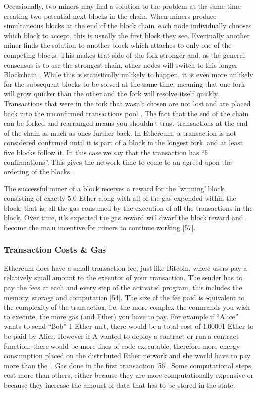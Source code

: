 \documentclass{article}
\begin{document}
Occasionally, two miners may find a solution to the problem at the same time creating two potential next blocks in the chain. When miners produce simultaneous blocks at the end of the block chain, each node individually chooses which block to accept, this is usually the first block they see. Eventually another miner finds the solution to another block which attaches to only one of the competing blocks. This makes that side of the fork stronger and, as the general consensus is to use the strongest chain, other nodes will switch to this longer Blockchain \citep{20_developer_guide_bitcoin_2016}. While this is statistically unlikely to happen, it is even more unlikely for the subsequent blocks to be solved at the same time, meaning that one fork will grow quicker than the other and the fork will resolve itself quickly. Transactions that were in the fork that wasn't chosen are not lost and are placed back into the unconfirmed transactions pool \citep{4_driscoll_2016}. The fact that the end of the chain can be forked and rearranged means you shouldn't trust transactions at the end of the chain as much as ones further back. In Ethereum, a transaction is not considered confirmed until it is part of a block in the longest fork, and at least five blocks follow it. In this case we say that the transaction has ``5 confirmations''. This gives the network time to come to an agreed-upon the ordering of the blocks \citep{35_nielsen_2013}.

The successful miner of a block receives a reward for the 'winning' block, consisting of exactly 5.0 Ether along with all of the gas expended within the block, that is, all the gas consumed by the execution of all the transactions in the block. Over time, it's expected the gas reward will dwarf the block reward and become the main incentive for miners to continue working {\Large [57]}.

\cleardoublepage
\subsubsection{Transaction Costs \& Gas}
Ethereum does have a small transaction fee, just like Bitcoin, where users pay a relatively small amount to the executor of your transaction. The sender has to pay the fees at each and every step of the activated program, this includes the memory, storage and computation {\Large [54]}. The size of the fee paid is equivalent to the complexity of the transaction, i.e. the more complex the commands you wish to execute, the more gas (and Ether) you have to pay. For example if ``Alice'' wants to send ``Bob'' 1 Ether unit, there would be a total cost of 1.00001 Ether to be paid by Alice. However if A wanted to deploy a contract or run a contract function, there would be more lines of code executable, therefore more energy consumption placed on the distributed Ether network and she would have to pay more than the 1 Gas done in the first transaction {\Large [56]}. Some computational steps cost more than others, either because they are more computationally expensive or because they increase the amount of data that has to be stored in the state. 
\end{document}
